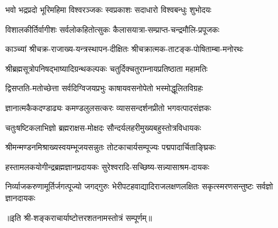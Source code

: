 \twolineshloka
{भवो भद्रप्रदो भूरिमहिमा विश्वरञ्जकः}
{स्वप्रकाशः सदाधारो विश्वबन्धुः शुभोदयः}

\twolineshloka
{विशालकीर्तिर्वागीशः सर्वलोकहितोत्सुकः}
{कैलासयात्रा-सम्प्राप्त-चन्द्रमौलि-प्रपूजकः}

\twolineshloka
{काञ्च्यां श्रीचक्र-राजाख्य-यन्त्रस्थापन-दीक्षितः}
{श्रीचक्रात्मक-ताटङ्क-पोषिताम्बा-मनोरथः}

\twolineshloka
{श्रीब्रह्मसूत्रोपनिषद्भाष्यादिग्रन्थकल्पकः}
{चतुर्दिक्चतुराम्नायप्रतिष्ठाता महामतिः}

\twolineshloka
{द्विसप्तति-मतोच्छेत्ता सर्वदिग्विजयप्रभुः}
{काषायवसनोपेतो भस्मोद्धूलितविग्रहः}

\twolineshloka
{ज्ञानात्मकैकदण्डाढ्यः कमण्डलुलसत्करः}
{व्याससन्दर्शनप्रीतो भगवत्पादसंज्ञकः}

\twolineshloka
{चतुःषष्टिकलाभिज्ञो ब्रह्मराक्षस-मोक्षदः}
{सौन्दर्यलहरीमुख्यबहुस्तोत्रविधायकः}

\twolineshloka
{श्रीमन्मण्डनमिश्राख्यस्वयम्भूजयसन्नुतः}
{तोटकाचार्यसम्पूज्यः पद्मपादार्चिताङ्घ्रिकः}

\twolineshloka
{हस्तामलकयोगीन्द्रब्रह्मज्ञानप्रदायकः}
{सुरेश्वरादि-सच्छिष्य-सन्न्यासाश्रम-दायकः}

\threelineshloka
{निर्व्याजकरुणामूर्तिर्जगत्पूज्यो जगद्गुरुः}
{भेरीपटहवाद्यादिराजलक्षणलक्षितः}
{सकृत्स्मरणसन्तुष्टः सर्वज्ञो ज्ञानदायकः}

॥इति श्री-शङ्कराचार्याष्टोत्तरशतनामस्तोत्रं सम्पूर्णम्॥
